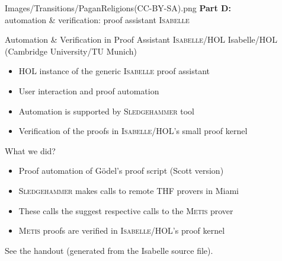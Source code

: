 
\begin{transitionframe}{Images/Transitions/PaganReligions(CC-BY-SA).png} \Large \centering
\textbf{Part D:} \\[.5em]
\quad automation \& verification: proof assistant \textsc{Isabelle} \\[2em]
\end{transitionframe}



\begin{frame}{Automation \& Verification in Proof Assistant \textsc{Isabelle/HOL}} \large
Isabelle/HOL   (Cambridge University/TU Munich)
\begin{itemize}
\item HOL instance of the generic \textsc{Isabelle} proof assistant
\item User interaction and proof automation 
\item Automation is supported by \textsc{Sledgehammer} tool
\item Verification of the proofs in \textsc{Isabelle/HOL}'s small proof kernel
\end{itemize}
\vfill
What we did?
\begin{itemize}
\item Proof automation of G\"odel's proof script (Scott version)
\item \textsc{Sledgehammer} makes calls to remote THF provers in Miami
\item These calls the suggest respective calls to the \textsc{Metis} prover
\item \textsc{Metis} proofs are verified in \textsc{Isabelle/HOL}'s proof kernel
\end{itemize}
\vfill
See the handout (generated from the Isabelle source file).
\end{frame}


